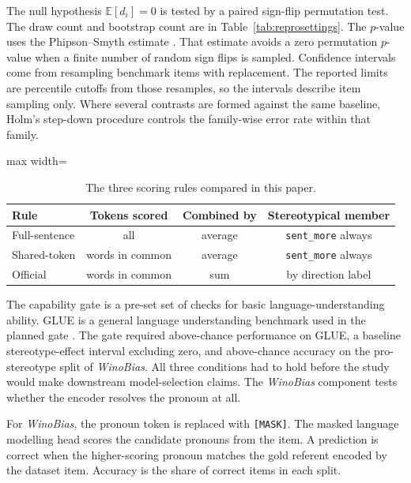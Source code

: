 \documentclass[sigconf,natbib=true,anonymous=true]{acmart}
\begin{document}
The null hypothesis $\mathbb{E}[d_i] = 0$ is tested by a paired sign-flip
permutation test. The draw count and bootstrap count are in
Table~\ref{tab:reprosettings}. The $p$-value uses the Phipson--Smyth estimate
\citep{phipson2010permutation}. That estimate avoids a zero permutation
$p$-value when a finite number of random sign flips is sampled. Confidence
intervals come from resampling benchmark items with replacement. The reported
limits are percentile cutoffs from those resamples, so the intervals describe
item sampling only. Where several contrasts are formed against the same
baseline, Holm's step-down procedure controls the family-wise error rate within
that family.

\begin{table}[t]
\centering
\caption{The three scoring rules compared in this paper.}
\label{tab:rules}
\footnotesize
\begin{adjustbox}{max width=\columnwidth}
\begin{tabular}{lccc}
\toprule
Rule & Tokens scored & Combined by & Stereotypical member \\
\midrule
Full-sentence  & all             & average & \texttt{sent\_more} always \\
Shared-token   & words in common & average & \texttt{sent\_more} always \\
Official       & words in common & sum     & by direction label \\
\bottomrule
\end{tabular}
\end{adjustbox}
\end{table}

\label{sec:gate}
The capability gate is a pre-set set of checks for basic language-understanding
ability. GLUE is a general language understanding benchmark used in the planned
gate \citep{wang2018glue}. The gate required above-chance performance on GLUE, a
baseline stereotype-effect interval excluding zero, and above-chance accuracy on
the pro-stereotype split of \emph{WinoBias}. All three conditions had to hold
before the study would make downstream model-selection claims. The
\emph{WinoBias} component tests whether the encoder resolves the pronoun at all.

For \emph{WinoBias}, the pronoun token is replaced with \texttt{[MASK]}. The
masked language modelling head scores the candidate pronouns from the item. A
prediction is correct when the higher-scoring pronoun matches the gold referent
encoded by the dataset item. Accuracy is the share of correct items in each
split.
\end{document}
